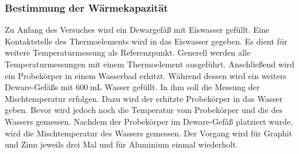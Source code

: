 \subsubsection{Bestimmung der Wärmekapazität}
Zu Anfang des Versuches wird ein Dewargefäß mit Eiswasser gefüllt.
Eine Kontaktstelle des Thermoelements wird in das Eiswasser gegeben.
Es dient für weitere Temperaturmessung als Referenzpunkt. %
Generell werden alle Temperaturmessungen mit einem Thermoelement ausgeführt.
Anschließend wird ein Probekörper in einem Wasserbad erhitzt.
Während dessen wird ein weiters Deware-Gefäßs mit $\SI{600}{\milli\liter}$ Wasser gefüllt. %
In ihm soll die Messung der Mischtemperatur erfolgen.
Dazu wird der erhitzte Probekörper in das Wasser geben. %
Bevor wird jedoch noch die Temperatur vom Probekörper und die des Wassers gemessen. %
Nachdem der Probekörper im Deware-Gefäß platziert wurde, wird die Mischtemperatur des
Wassers gemessen. Der Vorgang wird für Graphit und Zinn jeweils drei Mal und für
Aluminium einmal wiederholt.
